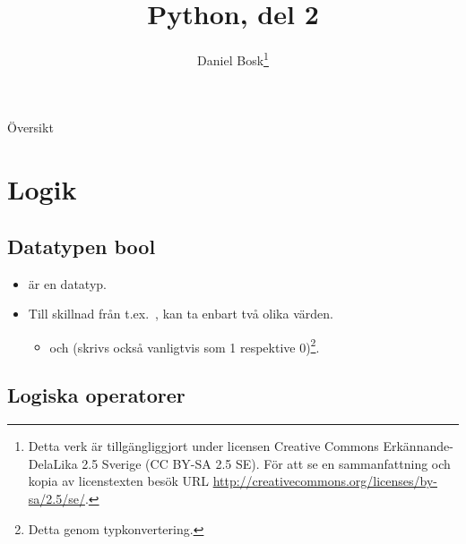 \documentclass{beamer}
\title{%
  Python, del 2
}
\author{Daniel Bosk\footnote{%
  \tiny
  Detta verk är tillgängliggjort under licensen Creative Commons 
  Erkännande-DelaLika 2.5 Sverige (CC BY-SA 2.5 SE).
  För att se en sammanfattning och kopia av licenstexten besök URL 
  \url{http://creativecommons.org/licenses/by-sa/2.5/se/}.
}}
\institute[MIUN IKS]{%
  Avdelningen för informations- och kommunikationssytem (IKS),\\
  Mittuniversitetet, Sundsvall.
}
\date{\svnId}
\begin{document}
\begin{frame}
  \titlepage
\end{frame}

\begin{frame}{Översikt}
  \begin{multicols}{2}
    \tableofcontents
  \end{multicols}
\end{frame}

%  





\section{Logik}

\subsection{Datatypen bool}

\begin{frame}{\insertsubsectionhead}
  \begin{itemize}
    \item {} är en datatyp.

    \item Till skillnad från t.ex.\ , kan ta enbart två olika värden.
      \begin{itemize}
        \item {} och  (skrivs också vanligtvis som 
          1 respektive 0)\footnote{Detta genom typkonvertering.}.
      \end{itemize}

  \end{itemize}
\end{frame}

\subsection{Logiska operatorer}
\end{document}
